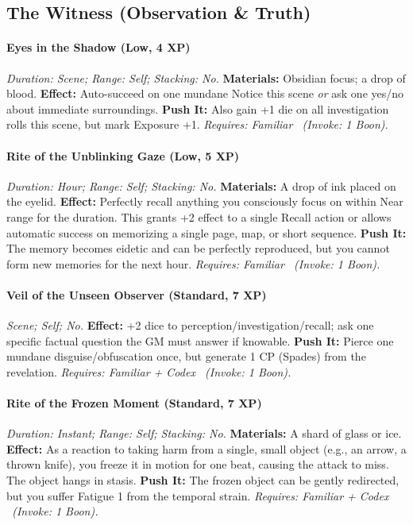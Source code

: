 \documentclass[12pt,twoside]{book}
\begin{document}
\subsection{The Witness (Observation \& Truth)}
\paragraph{Eyes in the Shadow (Low, 4 XP)} \emph{Duration: Scene; Range: Self; Stacking: No.}
\textbf{Materials:} Obsidian focus; a drop of blood.
\textbf{Effect:} Auto-succeed on one mundane Notice this scene \emph{or} ask one yes/no about immediate surroundings.
\textbf{Push It:} Also gain +1 die on all investigation rolls this scene, but mark Exposure +1.
\emph{Requires: Familiar \ (\textit{Invoke:} 1 Boon).}
\paragraph{Rite of the Unblinking Gaze (Low, 5 XP)} \emph{Duration: Hour; Range: Self; Stacking: No.}
\textbf{Materials:} A drop of ink placed on the eyelid.
\textbf{Effect:} Perfectly recall anything you consciously focus on within Near range for the duration. This grants +2 effect to a single Recall action or allows automatic success on memorizing a single page, map, or short sequence.
\textbf{Push It:} The memory becomes eidetic and can be perfectly reproduced, but you cannot form new memories for the next hour.
\emph{Requires: Familiar \ (\textit{Invoke:} 1 Boon).}
\paragraph{Veil of the Unseen Observer (Standard, 7 XP)} \emph{Scene; Self; No.}
\textbf{Effect:} +2 dice to perception/investigation/recall; ask one specific factual question the GM must answer if knowable.
\textbf{Push It:} Pierce one mundane disguise/obfuscation once, but generate 1 CP (Spades) from the revelation.
\emph{Requires: Familiar + Codex \ (\textit{Invoke:} 1 Boon).}
\paragraph{Rite of the Frozen Moment (Standard, 7 XP)} \emph{Duration: Instant; Range: Self; Stacking: No.}
\textbf{Materials:} A shard of glass or ice.
\textbf{Effect:} As a reaction to taking harm from a single, small object (e.g., an arrow, a thrown knife), you freeze it in motion for one beat, causing the attack to miss. The object hangs in stasis.
\textbf{Push It:} The frozen object can be gently redirected, but you suffer Fatigue 1 from the temporal strain.
\emph{Requires: Familiar + Codex \ (\textit{Invoke:} 1 Boon).}
\end{document}
